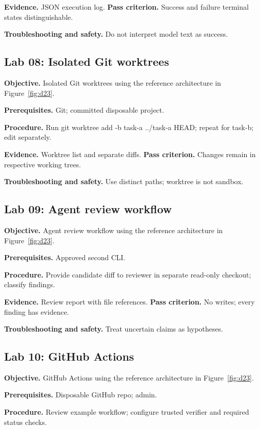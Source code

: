 \textbf{Evidence.} JSON execution log. \textbf{Pass criterion.} Success and failure terminal states distinguishable.

\textbf{Troubleshooting and safety.} Do not interpret model text as success.

\subsection{Lab 08: Isolated Git worktrees}

\textbf{Objective.} Isolated Git worktrees using the reference architecture in Figure~\ref{fig:d23}.

\textbf{Prerequisites.} Git; committed disposable project.

\textbf{Procedure.} Run git worktree add -b task-a ../task-a HEAD; repeat for task-b; edit separately.

\textbf{Evidence.} Worktree list and separate diffs. \textbf{Pass criterion.} Changes remain in respective working trees.

\textbf{Troubleshooting and safety.} Use distinct paths; worktree is not sandbox.

\subsection{Lab 09: Agent review workflow}

\textbf{Objective.} Agent review workflow using the reference architecture in Figure~\ref{fig:d23}.

\textbf{Prerequisites.} Approved second CLI.

\textbf{Procedure.} Provide candidate diff to reviewer in separate read-only checkout; classify findings.

\textbf{Evidence.} Review report with file references. \textbf{Pass criterion.} No writes; every finding has evidence.

\textbf{Troubleshooting and safety.} Treat uncertain claims as hypotheses.

\subsection{Lab 10: GitHub Actions}

\textbf{Objective.} GitHub Actions using the reference architecture in Figure~\ref{fig:d23}.

\textbf{Prerequisites.} Disposable GitHub repo; admin.

\textbf{Procedure.} Review example workflow; configure trusted verifier and required status checks.

